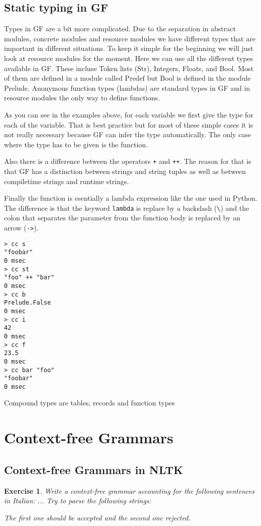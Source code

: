 \documentclass{scrartcl}
\newtheorem{exercise}{Exercise}
\begin{document}
\subsection{Static typing in GF}

Types in GF are a bit more complicated. Due to the separation in abstract modules, concrete modules and resource modules we have different types that are important in different situations. To keep it simple for the beginning we will just look at resource modules for the moment. Here we can use all the different types available in GF. These incluse Token lists (Str), Integers, Floats, and Bool. Most of them are defined in a module called Predef but Bool is defined in the module Prelude. Anonymous function types (lambdas) are standard types in GF and in resource modules the only way to define functions.



As you can see in the examples above, for each variable we first give the type for each of the variable. That is best practice but for most of these simple cases it is not really necessary because GF can infer the type automatically. The only case where the type has to be given is the function.

Also there is a difference between the operators \texttt{+} and \texttt{++}. The reason for that is that GF has a distinction between strings and string tuples as well as between compiletime strings and runtime strings.

Finally the function is esentially a lambda expression like the one used in Python. The difference is that the keyword \texttt{lambda} is replace by a backslash (\texttt{\textbackslash}) and the colon that separates the parameter from the function body is replaced by an arrow (\texttt{->}).

\begin{verbatim}
> cc s
"foobar"
0 msec
> cc st
"foo" ++ "bar"
0 msec
> cc b
Prelude.False
0 msec
> cc i
42
0 msec
> cc f
23.5
0 msec
> cc bar "foo"
"foobar"
0 msec
\end{verbatim}

Compound types are tables, records and function types
\section{Context-free Grammars}
\subsection{Context-free Grammars in NLTK}
\begin{exercise}
  Write a context-free grammar accounting for the following sentences in Italian:
  ...
  Try to parse the following strings:

  The first one should be accepted and the second one rejected.
\end{exercise}
\end{document}

